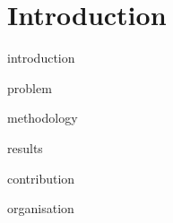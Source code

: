\documentclass[../../main.tex]{subfiles}
\begin{document}
\chapter{Introduction}
\label{chap__introduction}

{introduction}

{problem}

{methodology}

{results}

{contribution}

{organisation}

\cleardoublepage
\end{document}
